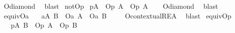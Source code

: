 \begin{isabellebody}
%
\isatagproof
{}\isamarkupfalse%
\ O{\isacharunderscore}diamond\ \isamarkupfalse%
\ blast%
\endisatagproof
{\isafoldproof}%
%
\isadelimproof
\isanewline
%
\endisadelimproof
{}\isamarkupfalse%
\ not{\isacharunderscore}Op{\isacharcolon}\isanewline
{}\ {\isachardoublequoteopen}{\isasymTurnstile}{\isacharparenleft}{\isacharparenleft}{\isasymbox}\isactrlsub pA{\isacharparenright}\ \isactrlbold {\isasymrightarrow}\ {\isacharparenleft}{\isacharparenleft}\isactrlbold {\isasymnot}{\isacharparenleft}O\isactrlsub p\ A{\isacharparenright}{\isacharparenright}\ \isactrlbold {\isasymand}\ {\isacharparenleft}\isactrlbold {\isasymnot}{\isacharparenleft}O\isactrlsub p\ {\isacharparenleft}\isactrlbold {\isasymnot}A{\isacharparenright}{\isacharparenright}{\isacharparenright}{\isacharparenright}{\isacharparenright}{\isachardoublequoteclose}\isanewline
%
\isadelimproof
\ \ %
\endisadelimproof
%
\isatagproof
{}\isamarkupfalse%
\ O{\isacharunderscore}diamond\ \isamarkupfalse%
\ blast%
\endisatagproof
{\isafoldproof}%
%
\isadelimproof
\isanewline
%
\endisadelimproof
{}\isamarkupfalse%
\ equiv{\isacharunderscore}Oa{\isacharcolon}\isanewline
\ \ \ {\isachardoublequoteopen}{\isasymTurnstile}{\isacharparenleft}{\isacharparenleft}{\isasymbox}\isactrlsub a{\isacharparenleft}A\ \isactrlbold {\isasymequiv}B{\isacharparenright}{\isacharparenright}\ \isactrlbold {\isasymrightarrow}\ {\isacharparenleft}{\isacharparenleft}O\isactrlsub a\ A{\isacharparenright}\ \isactrlbold {\isasymequiv}\ {\isacharparenleft}O\isactrlsub a\ B{\isacharparenright}\ {\isacharparenright}{\isacharparenright}{\isachardoublequoteclose}\isanewline
%
\isadelimproof
\ \ %
\endisadelimproof
%
\isatagproof
{}\isamarkupfalse%
\ O{\isacharunderscore}contextual{\isacharunderscore}REA\ \isamarkupfalse%
\ blast%
\endisatagproof
{\isafoldproof}%
%
\isadelimproof
\isanewline
%
\endisadelimproof
{}\isamarkupfalse%
\ equiv{\isacharunderscore}Op{\isacharcolon}\isanewline
\ \ \ {\isachardoublequoteopen}{\isasymTurnstile}{\isacharparenleft}{\isacharparenleft}{\isasymbox}\isactrlsub p{\isacharparenleft}A\ \isactrlbold {\isasymequiv}B{\isacharparenright}{\isacharparenright}\ \isactrlbold {\isasymrightarrow}\ {\isacharparenleft}{\isacharparenleft}O\isactrlsub p\ A{\isacharparenright}\ \isactrlbold {\isasymequiv}\ {\isacharparenleft}O\isactrlsub p\ B{\isacharparenright}\ {\isacharparenright}{\isacharparenright}{\isachardoublequoteclose}\isanewline

\end{isabellebody}
